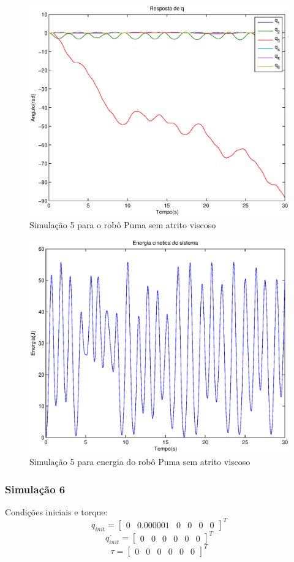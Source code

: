 \documentclass{article}
\begin{document}
\begin{figure}[H]
	\centering
	\includegraphics[width=0.8\linewidth]{../longsims/sime1ode.eps}
	\caption{Simulação 5 para o robô Puma sem atrito viscoso}
	\label{fig:pumasim5nf}
\end{figure}

\begin{figure}[H]
	\centering
	\includegraphics[width=0.8\linewidth]{../longsims/sime1kin.eps}
	\caption{Simulação 5 para energia do robô Puma sem atrito viscoso}
	\label{fig:energysim5nf}
\end{figure}

\subsubsection{Simulação 6}
Condições iniciais e torque:
\begin{equation}
\label{eq:sim6q}
q_{init}=\begin{bmatrix}
0 & 0.000001 & 0 & 0 & 0 & 0
\end{bmatrix}^T
\end{equation}
\begin{equation}
\label{eq:sim6qd}
\dot{q_{init}}=\begin{bmatrix}
0 & 0 & 0 & 0 & 0 & 0
\end{bmatrix}^T
\end{equation}
\begin{equation}
\label{eq:sim6tau}
\tau=\begin{bmatrix}
0 & 0 & 0 & 0 & 0 & 0
\end{bmatrix}^T
\end{equation}
\end{document}
